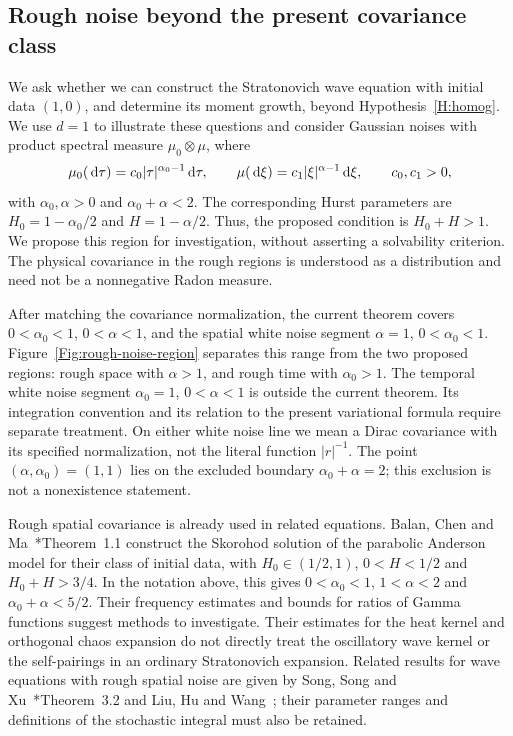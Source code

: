 \subsection{Rough noise beyond the present covariance class}
\label{S:future-rough-noise-extension}

We ask whether we can construct the Stratonovich wave equation with initial
data $(1,0)$, and determine its moment growth, beyond
Hypothesis~\ref{H:homog}.
We use $d = 1$ to illustrate these questions and consider Gaussian noises with
product spectral measure $\mu_0\otimes\mu$, where
\[
  \mu_0(\,\mathrm{d}\tau) = c_0|\tau|^{\alpha_0-1}\,\mathrm{d}\tau,
  \qquad
  \mu(\,\mathrm{d}\xi) = c_1|\xi|^{\alpha-1}\,\mathrm{d}\xi,
  \qquad c_0, c_1 > 0,
\]
with $\alpha_0, \alpha > 0$ and $\alpha_0 + \alpha < 2$. The corresponding Hurst
parameters are $H_0 = 1 - \alpha_0/2$ and $H = 1 - \alpha/2$. Thus, the
proposed condition is $H_0 + H > 1$. We propose this region for investigation,
without asserting a solvability criterion. The
physical covariance in the rough regions is understood as a distribution and
need not be a nonnegative Radon measure.

After matching the covariance normalization, the current theorem covers
$0 < \alpha_0 < 1$, $0 < \alpha < 1$, and the spatial white noise segment
$\alpha = 1$, $0 < \alpha_0 < 1$.
Figure~\ref{Fig:rough-noise-region} separates this range from the two proposed
regions: rough space with $\alpha > 1$, and rough time with $\alpha_0 > 1$. The
temporal white noise segment $\alpha_0 = 1$, $0 < \alpha < 1$ is outside the
current theorem. Its integration convention and its relation to the present
variational formula require separate treatment. On either white noise line
we mean a Dirac covariance with
its specified normalization, not the literal function $|r|^{-1}$. The point
$(\alpha,\alpha_0) = (1,1)$ lies on the excluded boundary $\alpha_0 + \alpha =
2$; this exclusion is not a nonexistence statement.



Rough spatial covariance is already used in related equations. Balan, Chen and
Ma~\cite{balan.chen.ea:22:parabolic}*{Theorem~1.1} construct the Skorohod
solution of the parabolic Anderson model for their class of initial data,
with $H_0 \in (1/2, 1)$, $0 < H < 1/2$ and
$H_0 + H > 3/4$. In the notation above, this gives $0 < \alpha_0 < 1$, $1 <
\alpha < 2$ and $\alpha_0 + \alpha < 5/2$. Their frequency estimates and bounds
for ratios of Gamma functions suggest methods to investigate. Their estimates
for the heat kernel and orthogonal chaos expansion do not directly treat the
oscillatory wave kernel or the self-pairings in an ordinary Stratonovich
expansion. Related results for wave equations with rough spatial noise are
given by Song, Song and Xu~\cite{song.song.ea:20:fractional}*{Theorem~3.2} and
Liu, Hu and Wang~\cite{liu.hu.ea:22:nonlinear}; their parameter ranges and
definitions of the stochastic integral must also be retained.

